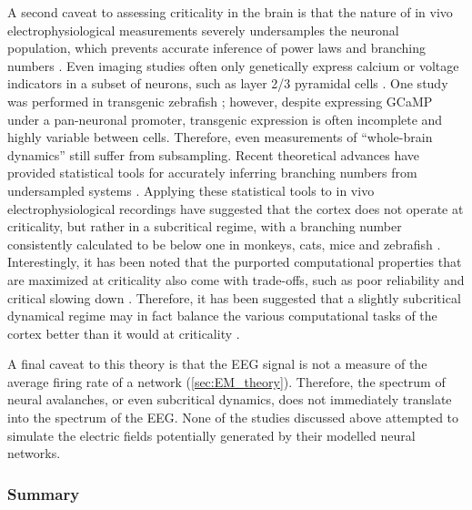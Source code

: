 A second caveat to assessing criticality in the brain is that the nature of in vivo electrophysiological measurements severely undersamples the neuronal population, which prevents accurate inference of power laws and branching numbers \cite{Priesemann2009}. Even imaging studies often only genetically express calcium or voltage indicators in a subset of neurons, such as layer 2/3 pyramidal cells \cite{Scott2014,Bellay2015}. One study was performed in transgenic zebrafish \cite{Ponce-Alvarez2018}; however, despite expressing GCaMP under a pan-neuronal promoter, transgenic expression is often incomplete and highly variable between cells. Therefore, even measurements of ``whole-brain dynamics'' still suffer from subsampling. Recent theoretical advances have provided statistical tools for accurately inferring branching numbers from undersampled systems \cite{Wilting2018}. Applying these statistical tools to in vivo electrophysiological recordings have suggested that the cortex does not operate at criticality, but rather in a subcritical regime, with a branching number consistently calculated to be below one in monkeys, cats, mice \cite{Wilting2018,Wilting2019} and zebrafish \cite{Suryadi2022}. Interestingly, it has been noted that the purported computational properties that are maximized at criticality also come with trade-offs, such as poor reliability \cite{Gollo2017} and critical slowing down \cite{Scheffer2012, Wilting2019a}. Therefore, it has been suggested that a slightly subcritical dynamical regime may in fact balance the various computational tasks of the cortex better than it would at criticality \cite{Wilting2019a}.

A final caveat to this theory is that the EEG signal is not a measure of the average firing rate of a network (\autoref{sec:EM_theory}). Therefore, the spectrum of neural avalanches, or even subcritical dynamics, does not immediately translate into the spectrum of the EEG. None of the studies discussed above attempted to simulate the electric fields potentially generated by their modelled neural networks. 

\subsubsection{Summary}

